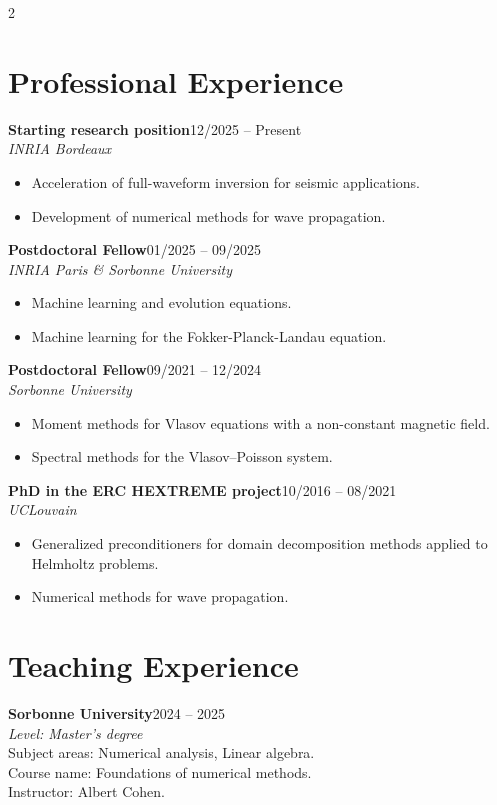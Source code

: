 \documentclass[10pt,a4paper]{article}
\newcommand{\entry}[4]{%
  \textbf{#1}\hfill{\small\color{muted}#2}\\
  \textit{#3}\\[-2pt]
  #4\par\vspace{4pt}
}
\begin{document}
\begin{paracol}{2}
\switchcolumn

\section*{Professional Experience}

\entry{Starting research position}{12/2025 -- Present}{INRIA Bordeaux}{
\begin{itemize}
  \item Acceleration of full-waveform inversion for seismic applications.
  \item Development of numerical methods for wave propagation.
\end{itemize}}

\entry{Postdoctoral Fellow}{01/2025 -- 09/2025}{INRIA Paris \& Sorbonne University}{
\begin{itemize}
  \item Machine learning and evolution equations.
  \item Machine learning for the Fokker-Planck-Landau equation.
\end{itemize}}

\entry{Postdoctoral Fellow}{09/2021 -- 12/2024}{Sorbonne University}{
\begin{itemize}
  \item Moment methods for Vlasov equations with a non-constant magnetic field.
  \item Spectral methods for the Vlasov--Poisson system.
\end{itemize}}

\entry{PhD in the ERC HEXTREME project}{10/2016 -- 08/2021}{UCLouvain}{
\begin{itemize}
  \item Generalized preconditioners for domain decomposition methods applied to Helmholtz problems. 
  \item Numerical methods for wave propagation.
\end{itemize}}

\section*{Teaching Experience}

\entry{Sorbonne University}{2024 -- 2025}{Level: Master's degree}{
Subject areas: Numerical analysis, Linear algebra.\\
Course name: Foundations of numerical methods.\\
Instructor: Albert Cohen.}


\end{paracol}
\end{document}

